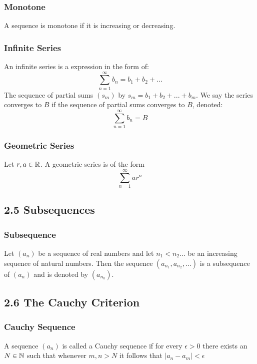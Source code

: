 \documentclass{article}
\begin{document}
\subsubsection*{Monotone}
A sequence is monotone if it is increasing or decreasing.

\subsubsection*{Infinite Series}
An infinite series is a expression in the form of:
\begin{equation*}
\sum_{n=1}^{\infty} b_n = b_1 + b_2 + ...
\end{equation*}
The sequence of partial sums $(s_m)$ by $s_m = b_1 + b_2 + ... + b_m$. We say the series converges to $B$ if the sequence of partial sums converges to $B$, denoted:
\begin{equation*}
\sum_{n=1}^{\infty} b_n = B
\end{equation*}

\subsubsection*{Geometric Series}
Let $r,a \in \protect\mathbb{R}$. A geometric series is of the form
\begin{equation*}
\sum_{n=1}^{\infty} ar^n
\end{equation*}

\subsection*{2.5 Subsequences}
\subsubsection*{Subsequence}
Let $(a_n)$ be a sequence of real numbers and let $n_1 < n_2 ...$ be an increasing sequence of natural numbers.
Then the sequence $(a_{n_1}, a_{n_2},...)$ is a subsequence of $(a_n)$ and is denoted by $(a_{n_k})$.

\subsection*{2.6 The Cauchy Criterion}
\subsubsection*{Cauchy Sequence}
A sequence $(a_n)$ is called a Cauchy sequence if for every $\epsilon > 0$ there exists an $N \in \protect\mathbb{N}$ such that whenever $m,n>N$ it follows that $|a_n -a_m|<\epsilon$
\end{document}
